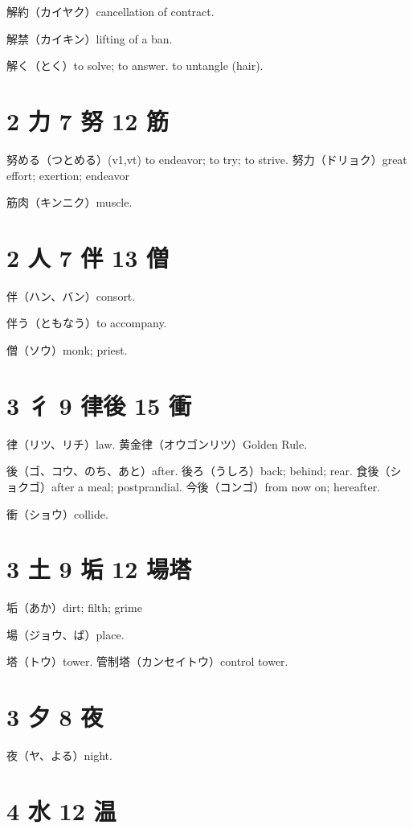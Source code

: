 解約（カイヤク）cancellation of contract.

解禁（カイキン）lifting of a ban.

解く（とく）to solve; to answer. to untangle (hair).

\section{2 力 7 努 12 筋}

努める（つとめる）(v1,vt) to endeavor; to try; to strive.
努力（ドリョク）great effort; exertion; endeavor

筋肉（キンニク）muscle.

\section{2 人 7 伴 13 僧}

伴（ハン、バン）consort.

伴う（ともなう）to accompany.

僧（ソウ）monk; priest.

\section{3 彳 9 律後 15 衝}

律（リツ、リチ）law.
黄金律（オウゴンリツ）Golden Rule.

後（ゴ、コウ、のち、あと）after.
後ろ（うしろ）back; behind; rear.
食後（ショクゴ）after a meal; postprandial.
今後（コンゴ）from now on; hereafter.

衝（ショウ）collide.

\section{3 土 9 垢 12 場塔}

垢（あか）dirt; filth; grime

場（ジョウ、ば）place.

塔（トウ）tower.
管制塔（カンセイトウ）control tower.

\section{3 夕 8 夜}

夜（ヤ、よる）night.

\section{4 水 12 温}

